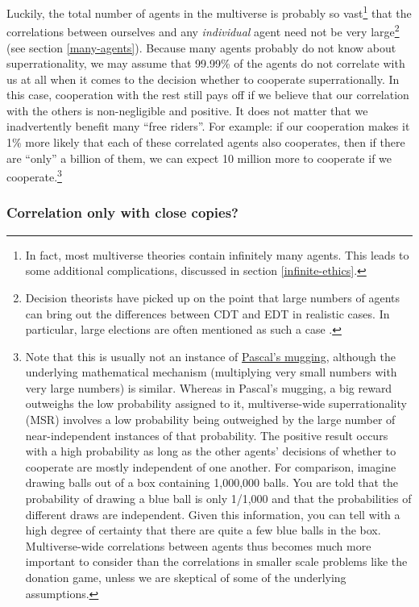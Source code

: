 Luckily, the total number of agents in the multiverse is probably so
vast\footnote{In fact, most multiverse theories contain infinitely many
  agents. This leads to some additional complications, discussed in
  section \ref{infinite-ethics}.} that the correlations between ourselves and any
\emph{individual} agent need not be very large\footnote{Decision
  theorists have picked up on the point that large numbers of agents can
  bring out the differences between CDT and EDT in realistic cases. In
  particular, large elections are often mentioned as such a case
  \parencite{Ahmed2014-ec}.} (see section
\ref{many-agents}). Because many
agents probably do not know about superrationality, we may assume that
99.99\% of the agents do not correlate with us at all when it comes to the decision whether to cooperate superrationally. In this case,
cooperation with the rest still pays off if we believe that our
correlation with the others is non-negligible and positive. It does not
matter that we inadvertently benefit many ``free riders''. For example:
if our cooperation makes it 1\% more likely that each of these
correlated agents also cooperates, then if there are ``only'' a billion
of them, we can expect 10 million more to cooperate if we
cooperate.\footnote{Note that this is usually not an instance of
  \href{https://wiki.lesswrong.com/wiki/Pascal\%27s_mugging}{Pascal's
  mugging}, although the underlying mathematical mechanism (multiplying
  very small numbers with very large numbers) is similar. Whereas in
  Pascal's mugging, a big reward outweighs the low probability assigned
  to it, multiverse-wide superrationality (MSR) involves a low
  probability being outweighed by the large number of near-independent
  instances of that probability. The positive result occurs with a high
  probability as long as the other agents' decisions of whether to
  cooperate are mostly independent of one another. For comparison,
  imagine drawing balls out of a box containing 1,000,000 balls. You are
  told that the probability of drawing a blue ball is only 1/1,000 and
  that the probabilities of different draws are independent. Given this
  information, you can tell with a high degree of certainty that there
  are quite a few blue balls in the box. Multiverse-wide correlations
  between agents thus becomes much more important to consider than the
  correlations in smaller scale problems like the donation game, unless
  we are skeptical of some of the underlying assumptions.}

\subsubsection{Correlation only with close
copies?}\label{correlation-only-with-close-copies}

